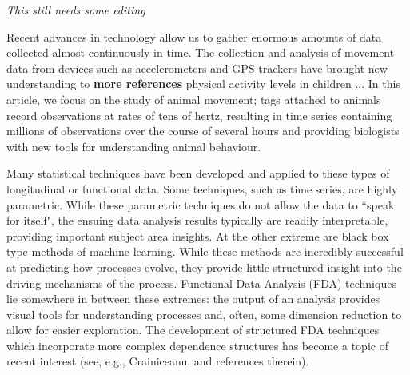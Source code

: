 


{\em{This still needs some editing}}

\vskip 10pt\noindent

Recent advances in technology allow us to gather enormous amounts of data collected almost continuously in time.
The collection and analysis of movement data from devices such as accelerometers and GPS trackers have brought new understanding to {\bf{more references}}  physical activity levels in children \citep{Morris:2007} ...
In this article, we focus on the study of animal movement;  tags attached to animals record observations at rates of tens of hertz, resulting in time series containing millions of observations over the course of several hours and providing biologists with new tools for understanding animal behaviour.

Many statistical techniques have been developed and applied to these types of longitudinal or functional data.  
Some techniques, such as time series, are highly parametric. 
While these parametric techniques do not allow the data to ``speak for itself", the ensuing data analysis results typically are readily interpretable, providing important subject area insights.
At the other extreme are black box type methods of machine learning.  
While these methods are incredibly successful at predicting how processes evolve, they provide little structured insight into the driving mechanisms of the process.
Functional Data Analysis (FDA) techniques lie somewhere in between these extremes: the output of an analysis provides visual tools for understanding processes and, often, some dimension reduction to allow for easier exploration.  
The development of structured FDA techniques which incorporate more complex dependence structures has become a topic of recent interest  (see, e.g., Crainiceanu. and references therein).

